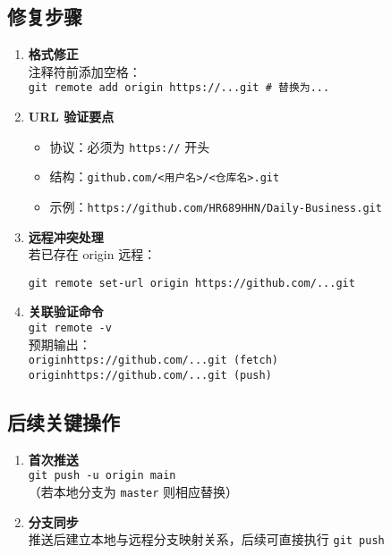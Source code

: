 \subsection{修复步骤}
\begin{enumerate}[leftmargin=*, nosep]
\item \textbf{格式修正} \\
注释符前添加空格：\\
\texttt{git remote add origin https://...git \# 替换为...}

\item \textbf{URL 验证要点}
\begin{itemize}[leftmargin=*, nosep]
\item 协议：必须为 \texttt{https://} 开头
\item 结构：\texttt{github.com/<用户名>/<仓库名>.git}
\item 示例：\texttt{https://github.com/HR689HHN/Daily-Business.git}
\end{itemize}

\item \textbf{远程冲突处理} \\
若已存在 origin 远程：
\begin{verbatim}
git remote set-url origin https://github.com/...git
\end{verbatim}

\item \textbf{关联验证命令} \\
\texttt{git remote -v} \\
预期输出：\\
\texttt{originhttps://github.com/...git (fetch)} \\
\texttt{originhttps://github.com/...git (push)}
\end{enumerate}

\subsection{后续关键操作}
\begin{enumerate}[leftmargin=*, nosep]
\item \textbf{首次推送} \\
\texttt{git push -u origin main} \\
（若本地分支为 \texttt{master} 则相应替换）

\item \textbf{分支同步} \\
推送后建立本地与远程分支映射关系，后续可直接执行 \texttt{git push}
\end{enumerate}

